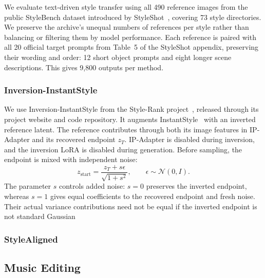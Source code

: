 \documentclass{article} %
\begin{document}
We evaluate text-driven style transfer using all 490 reference images from
the public StyleBench dataset introduced by StyleShot~\citep{styleshot},
covering 73 style directories.
We preserve the archive's unequal numbers of references per style rather
than balancing or filtering them by model performance. Each reference is
paired with all 20 official target prompts from Table~5 of the StyleShot
appendix, preserving their wording and order: 12 short object prompts and
eight longer scene descriptions. This gives 9,800 outputs per method.


\subsubsection{Inversion-InstantStyle}

We use Inversion-InstantStyle from the Style-Rank project~\citep{benaroche2024stylerank},
released through its project website and code repository. It augments
InstantStyle~\citep{instantstyle} with an inverted reference latent.
The reference contributes through both its image
features in IP-Adapter and its recovered endpoint $z_T$. IP-Adapter is
disabled during inversion, and the inversion LoRA is disabled during
generation. Before sampling, the endpoint is mixed with independent noise:
\begin{equation}
 z_{\mathrm{start}}=\frac{z_T+s\epsilon}{\sqrt{1+s^2}},
 \qquad \epsilon\sim\mathcal{N}(0,I).
 \label{eq:instantstyle-renoising}
\end{equation}
The parameter $s$ controls added noise: $s=0$ preserves the inverted
endpoint, whereas $s=1$ gives equal coefficients to the recovered endpoint
and fresh noise. Their actual variance contributions need not be equal if
the inverted endpoint is not standard Gaussian

\subsubsection{StyleAligned}

\subsection{Music Editing}
\label{sec:music-editing}
\end{document}
